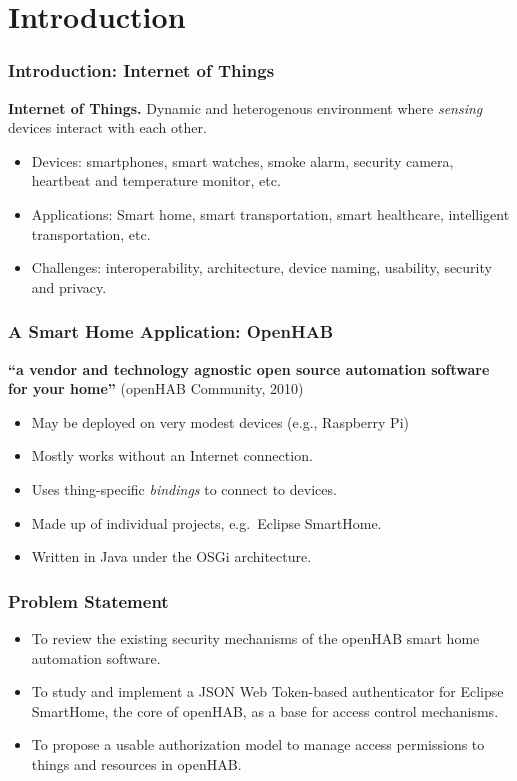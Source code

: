 \documentclass{beamer}
\begin{document}
\section{Introduction} %
\begin{frame}
\frametitle{Introduction: Internet of Things}
\textbf{Internet of Things.} Dynamic and heterogenous environment where \emph{sensing} devices interact with each other. 
\begin{itemize}
\setlength\itemsep{1.5em}
\item Devices: smartphones, smart watches, smoke alarm, security camera, heartbeat and temperature monitor, etc.
\item Applications: Smart home, smart transportation, smart healthcare, intelligent transportation, etc.
\item Challenges: interoperability, architecture, device naming, usability, security and privacy.  
\end{itemize}
\end{frame}
\begin{frame}
\frametitle{A Smart Home Application: OpenHAB}
\textbf{``a vendor and technology agnostic open source automation software for your home''} (openHAB Community, 2010)
\begin{itemize}
  \setlength\itemsep{1.5em}
\item May be deployed on very modest devices (e.g., Raspberry Pi)
\item Mostly works without an Internet connection.
\item Uses thing-specific \emph{bindings} to connect to devices.
\item Made up of individual projects, e.g.\ Eclipse SmartHome.
\item Written in Java under the OSGi architecture. 
\end{itemize}
\end{frame}
\begin{frame}
\frametitle{Problem Statement}
\begin{itemize}
  \setlength\itemsep{1.5em}
\item To review the existing security mechanisms of the openHAB smart home automation software.
\item To study and implement a JSON Web Token-based authenticator for Eclipse SmartHome, the core of openHAB, as a base for access control mechanisms.
\item To propose a usable authorization model to manage access permissions to things and resources in openHAB. 
\end{itemize}
\end{frame}
\end{document}
